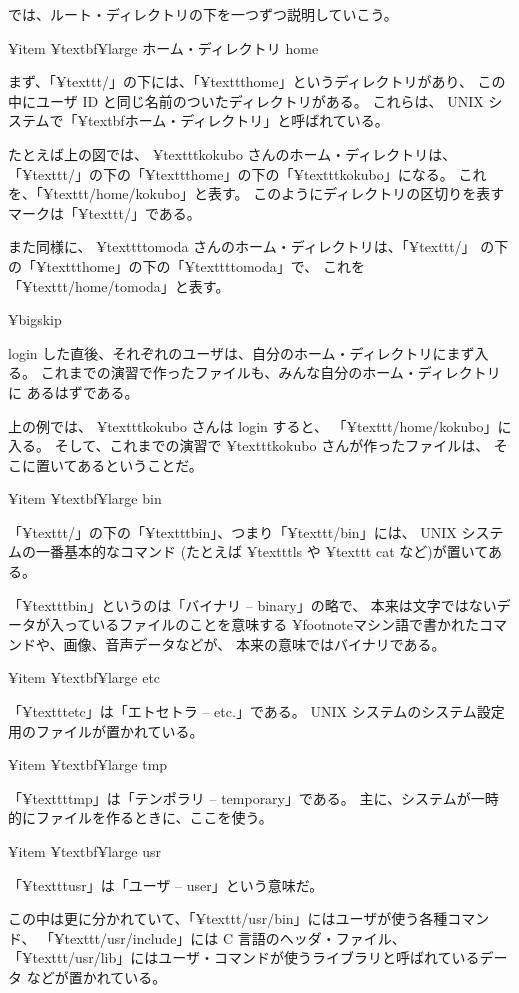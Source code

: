 では、ルート・ディレクトリの下を一つずつ説明していこう。

¥item ¥textbf{¥large ホーム・ディレクトリ home}

まず、「¥texttt{/}」の下には、「¥texttt{home}」というディレクトリがあり、
この中にユーザ ID と同じ名前のついたディレクトリがある。
これらは、 UNIX システムで「¥textbf{ホーム・ディレクトリ}」と呼ばれている。

たとえば上の図では、 ¥texttt{kokubo} さんのホーム・ディレクトリは、
「¥texttt{/}」の下の「¥texttt{home}」の下の「¥texttt{kokubo}」になる。
これを、「¥texttt{/home/kokubo}」と表す。
このようにディレクトリの区切りを表すマークは「¥texttt{/}」である。

また同様に、 ¥texttt{tomoda} さんのホーム・ディレクトリは、「¥texttt{/}」
の下の「¥texttt{home}」の下の「¥texttt{tomoda}」で、
これを「¥texttt{/home/tomoda}」と表す。

¥bigskip

 login した直後、それぞれのユーザは、自分のホーム・ディレクトリにまず入る。
これまでの演習で作ったファイルも、みんな自分のホーム・ディレクトリに
あるはずである。

上の例では、 ¥texttt{kokubo} さんは login すると、
「¥texttt{/home/kokubo}」に入る。
そして、これまでの演習で ¥texttt{kokubo} さんが作ったファイルは、
そこに置いてあるということだ。

¥item ¥textbf{¥large bin}

「¥texttt{/}」の下の「¥texttt{bin}」、つまり「¥texttt{/bin}」には、
 UNIX システムの一番基本的なコマンド
(たとえば ¥texttt{ls} や ¥texttt {cat} など)が置いてある。

「¥texttt{bin}」というのは「バイナリ -- binary」の略で、
本来は文字ではないデータが入っているファイルのことを意味する
¥footnote{マシン語で書かれたコマンドや、画像、音声データなどが、
本来の意味ではバイナリである}。

¥item ¥textbf{¥large etc}

「¥texttt{etc}」は「エトセトラ -- etc.」である。
 UNIX システムのシステム設定用のファイルが置かれている。

¥item ¥textbf{¥large tmp}

「¥texttt{tmp}」は「テンポラリ -- temporary」である。
主に、システムが一時的にファイルを作るときに、ここを使う。

¥item ¥textbf{¥large usr}

「¥texttt{usr}」は「ユーザ -- user」という意味だ。

この中は更に分かれていて、「¥texttt{/usr/bin}」にはユーザが使う各種コマンド、
「¥texttt{/usr/include}」には C 言語のヘッダ・ファイル、
「¥texttt{/usr/lib}」にはユーザ・コマンドが使うライブラリと呼ばれているデータ
などが置かれている。

